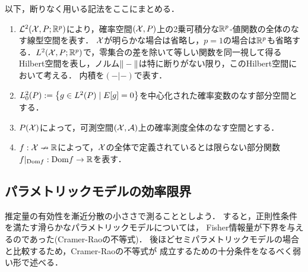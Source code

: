 \documentclass[uplatex, dvipdfmx]{jsarticle}
\begin{document}
\begin{notation}
    以下，断りなく用いる記法をここにまとめる．
    \begin{enumerate}
        \item $\mathcal{L}^2(\mathcal{X},P;\mathbb{R}^p)$により，確率空間$(\mathcal{X},P)$上の2乗可積分な$\mathbb{R}^p$-値関数の全体のなす線型空間を表す．
        $\mathcal{X}$が明らかな場合は省略し，$p=1$の場合は$\mathbb{R}^p$も省略する．$L^2(\mathcal{X},P;\mathbb{R}^p)$で，零集合の差を除いて等しい関数を同一視して得るHilbert空間を表し，ノルム$\|-\|$は特に断りがない限り，このHilbert空間において考える．
        内積を$(-|-)$で表す．
        \item $L^2_0(P):=\left\{g\in L^2(P)\mid E[g]=0\right\}$を中心化された確率変数のなす部分空間とする．
        \item $P(\mathcal{X})$によって，可測空間$(\mathcal{X},\mathcal{A})$上の確率測度全体のなす空間とする．
        \item $f:\mathcal{X}\nrightarrow\mathbb{R}$によって，$\mathcal{X}$の全体で定義されているとは限らない部分関数$f|_{\mathrm{Dom} f}:\mathrm{Dom} f\to\mathbb{R}$を表す．
    \end{enumerate}
\end{notation}

\subsection{パラメトリックモデルの効率限界}

\begin{tcolorbox}[colframe=ForestGreen, colback=ForestGreen!10!white,breakable,colbacktitle=ForestGreen!40!white,coltitle=black,fonttitle=\bfseries\sffamily,
title=]
    推定量の有効性を漸近分散の小ささで測ることとしよう．
    すると，正則性条件を満たす滑らかなパラメトリックモデルについては，
    Fisher情報量が下界を与えるのであった(Cramer-Raoの不等式)．
    後ほどセミパラメトリックモデルの場合と比較するため，Cramer-Raoの不等式が
    成立するための十分条件をなるべく弱い形で述べる．
\end{tcolorbox}
\end{document}
